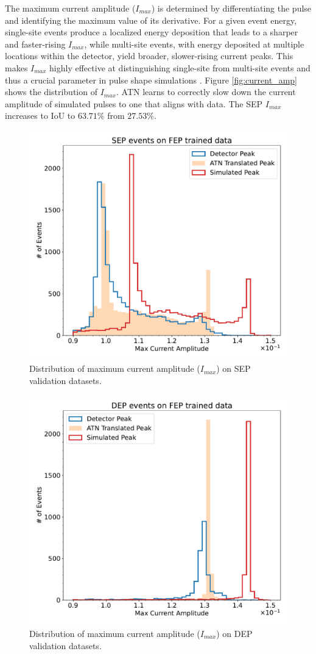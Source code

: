 The maximum current amplitude ($I_{max}$) is determined by differentiating the pulse and identifying the maximum value of its derivative. For a given event energy, single-site events produce a localized energy deposition that leads to a sharper and faster-rising $I_{max}$, while multi-site events, with energy deposited at multiple locations within the detector, yield broader, slower-rising current peaks. This makes $I_{max}$ highly effective at distinguishing single-site from multi-site events and thus a crucial parameter in pulse shape simulations \cite{mjd_psd}. Figure \ref{fig:current_amp} shows the distribution of $I_{max}$.  ATN learns to correctly slow down the current amplitude of simulated pulses to one that aligns with data. The SEP $I_{max}$ increases to IoU to $63.71\%$ from $27.53\%$.
  
\begin{figure}[htb!]
\centering
\includegraphics[width=0.8\linewidth,trim={0pc 0pc 0pc 3pc},clip]{ch8/figs/SEP_amp.pdf}
\caption{ Distribution of maximum current amplitude ($I_{max}$) on SEP validation datasets.}
\label{fig:current_amp_sep}
\end{figure}

\begin{figure}[htb!]
\centering
\includegraphics[width=0.8\linewidth,trim={0pc 0pc 0pc 3pc},clip]{ch8/figs/DEP_amp.pdf}
\caption{ Distribution of maximum current amplitude ($I_{max}$) on DEP validation datasets.}
\label{fig:current_amp_dep}
\end{figure}

